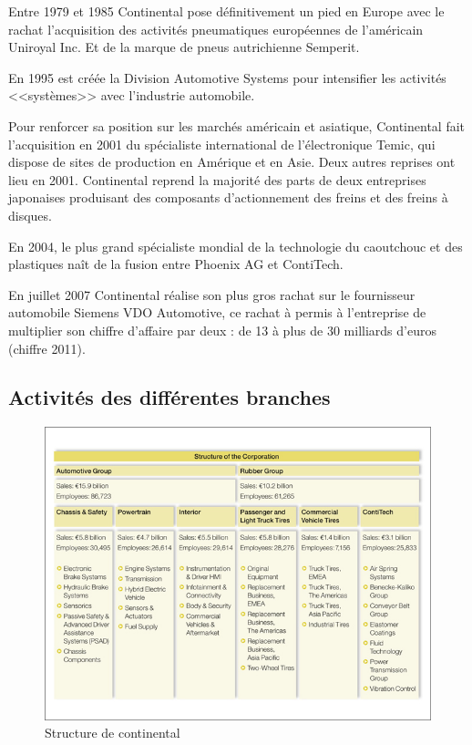		Entre 1979 et 1985 Continental pose définitivement un pied en Europe avec le rachat l'acquisition des activités pneumatiques européennes de l'américain Uniroyal Inc. Et de la marque de pneus autrichienne Semperit.

		En 1995 est créée la Division Automotive Systems pour intensifier les activités <<systèmes>> avec l'industrie automobile.

		Pour renforcer sa position sur les marchés américain et asiatique, Continental fait l'acquisition en 2001 du spécialiste international de l'électronique Temic, qui dispose de sites de production en Amérique et en Asie. Deux autres reprises ont lieu en 2001. Continental reprend la majorité des parts de deux entreprises japonaises produisant des composants d'actionnement des freins et des freins à disques.

		En 2004, le plus grand spécialiste mondial de la technologie du caoutchouc et des plastiques naît de la fusion entre Phoenix AG et ContiTech.

		En juillet 2007 Continental réalise son plus gros rachat sur le fournisseur automobile Siemens VDO Automotive, ce rachat à permis à l'entreprise de multiplier son chiffre d'affaire par deux : de 13 à plus de 30 milliards d'euros (chiffre 2011). 

		
		\subsection{Activités des différentes branches}
		\begin{figure}[H]
			\centering
			\includegraphics[width=18cm]{contents/images/structureConti.jpg}
			\caption{Structure de continental}
			\label{fig:structConti}
		\end{figure}

